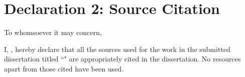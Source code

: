 \documentclass[a4paper,12pt,leqno,openbib]{memoir}
\begin{document}
{}

\chapter*{Declaration 2: Source Citation}
\vspace{4cm} 

To whomsoever it may concern,

I, \utsname, hereby declare that all the sources used for the work in the submitted dissertation titled ``\utstitle" are appropriately cited in the dissertation. No resources apart from those cited have been used. 


\noindent

\vspace{4cm}
\noindent
{}
\end{document}
